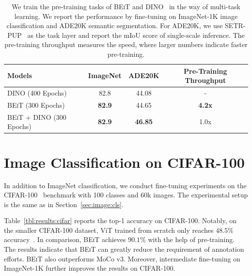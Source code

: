 \documentclass{article}
\newcommand\our{\textsc{BEiT}}
\begin{document}
\begin{table}[h]
\centering
\begin{tabular}{lccc}
\toprule
\bf 
Models & \bf ImageNet & \bf ADE20K & \bf Pre-Training Throughput \\ \midrule
DINO (400 Epochs)           & 82.8 & 44.08 & - \\
\our{} (300 Epochs)             & \textbf{82.9}    &  44.65 & \textbf{4.2x} \\
\our{} + DINO (300 Epochs) & \textbf{82.9} & \textbf{46.85} & 1.0x \\
\bottomrule
\end{tabular}
\caption{We train the pre-training tasks of \our{} and DINO~\citep{dino} in the way of multi-task learning. We report the performance by fine-tuning on ImageNet-1K image classification and ADE20K semantic segmentation. For ADE20K, we use SETR-PUP~\citep{setr} as the task layer and report the mIoU score of single-scale inference.
The pre-training throughput measures the speed, where larger numbers indicate faster pre-training.}
\label{tbl:multitask:dino}
\end{table}


\section{Image Classification on CIFAR-100}
\label{app:cifar100}

In addition to ImageNet classification, we conduct fine-tuning experiments on the CIFAR-100~\citep{cifar100} benchmark with 100 classes and 60k images. The experimental setup is the same as in Section~\ref{sec:image:cls}.

Table~\ref{tbl:results:cifar} reports the top-1 accuracy on CIFAR-100.
Notably, on the smaller CIFAR-100 dataset, ViT trained from scratch only reaches $48.5\%$ accuracy~\citep{mocov3}. In comparison, \our{} achieves $90.1\%$ with the help of pre-training.
The results indicate that \our{} can greatly reduce the requirement of annotation efforts.
\our{} also outperforms MoCo v3.
Moreover, intermediate fine-tuning on ImageNet-1K further improves the results on CIFAR-100.
\end{document}
